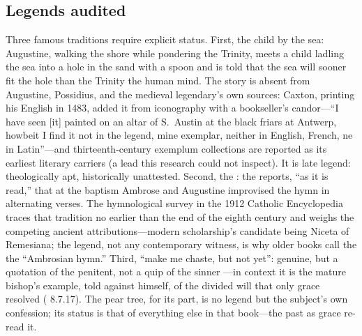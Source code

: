 \subsection{Legends audited}

Three famous traditions require explicit status. First, the child by the
sea: Augustine, walking the shore while pondering the Trinity, meets a
child ladling the sea into a hole in the sand with a spoon and is told that
the sea will sooner fit the hole than the Trinity the human mind. The story
is absent from Augustine, Possidius, and the medieval legendary's own
sources: Caxton, printing his English  in 1483, added
it from iconography with a bookseller's candor---``I have seen [it] painted
on an altar of S.~Austin at the black friars at Antwerp, howbeit I find it
not in the legend, mine exemplar, neither in English, French, ne in
Latin''---and thirteenth-century exemplum collections are reported as its
earliest literary carriers (a lead this research could not inspect). It is
late legend: theologically apt, historically unattested. Second, the
: the  reports, ``as it is read,'' that at
the baptism Ambrose and Augustine improvised the hymn in alternating
verses. The hymnological survey in the 1912 Catholic Encyclopedia traces
that tradition no earlier than the end of the eighth century and weighs the
competing ancient attributions---modern scholarship's candidate being
Niceta of Remesiana; the legend, not any contemporary witness, is why older
books call the  the ``Ambrosian hymn.'' Third, ``make me
chaste, but not
yet'': genuine, but a quotation of the penitent, not a quip of the sinner
---in context it is the mature bishop's example, told against himself, of
the divided will that only grace resolved ( 8.7.17). The
pear tree, for its part, is no legend but the subject's own confession; its
status is that of everything else in that book---the past as grace
re-read it.
